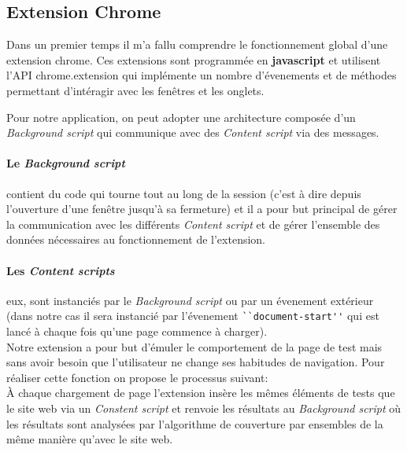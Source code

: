 \documentclass[oneside,a4paper,12pt]{article}
\begin{document}
\subsection{Extension Chrome}\label{Projet:extension}

Dans un premier temps il m'a fallu comprendre le fonctionnement global d'une extension chrome. Ces extensions sont programmée en \textbf{javascript} et utilisent l'API chrome.extension qui implémente un nombre d'évenements et de méthodes permettant d'intéragir avec les fenêtres et les onglets. 

Pour notre application, on peut adopter une architecture composée d'un \textit{Background script} qui communique avec des \textit{Content script} via des messages. 
\paragraph*{Le \textit{Background script}} contient du code qui tourne tout au long de la session (c'est à dire depuis l'ouverture d'une fenêtre jusqu'à sa fermeture) et il a pour but principal de gérer la communication avec les différents \textit{Content script} et de gérer l'ensemble des données nécessaires au fonctionnement de l'extension.
\paragraph*{Les \textit{Content scripts}} eux, sont instanciés par le \textit{Background script} ou par un évenement extérieur (dans notre cas il sera instancié par l'évenement \lstinline{``document-start''} qui est lancé à chaque fois qu'une page commence à charger).\\

Notre extension a pour but d'émuler le comportement de la page de test mais sans avoir besoin que l'utilisateur ne change ses habitudes de navigation. Pour réaliser cette fonction on propose le processus suivant:\\

\`A chaque chargement de page l'extension insère les mêmes éléments de tests que le site web via un \textit{Constent script} et renvoie les résultats au \textit{Background script} où les résultats sont analysées par l'algorithme de couverture par ensembles de la même manière qu'avec le site web.\\
\end{document}

